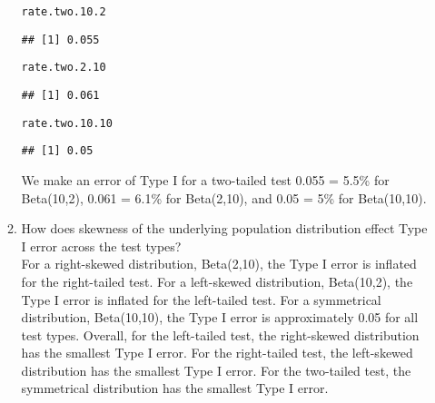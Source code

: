 \documentclass{article}\usepackage[]{graphicx}\usepackage[]{xcolor}
\makeatletter
\newcommand{\hldef}[1]{\textcolor[rgb]{0.345,0.345,0.345}{#1}}%
\newenvironment{kframe}{%
 \def\at@end@of@kframe{}%
 \ifinner\ifhmode%
  \def\at@end@of@kframe{\end{minipage}}%
  \begin{minipage}{\columnwidth}%
 \fi\fi%
 \def\FrameCommand##1{\hskip\@totalleftmargin \hskip-\fboxsep
 \colorbox{shadecolor}{##1}\hskip-\fboxsep
     \hskip-\linewidth \hskip-\@totalleftmargin \hskip\columnwidth}%
 \MakeFramed {\advance\hsize-\width
   \@totalleftmargin\z@ \linewidth\hsize
   \@setminipage}}%
 {\par\unskip\endMakeFramed%
 \at@end@of@kframe}
\newenvironment{knitrout}{}{} %
\makeatother
\begin{document}
\begin{enumerate}
\begin{enumerate}
\begin{knitrout}
\begin{kframe}
\begin{alltt}
\hldef{rate.two.10.2}
\end{alltt}
\begin{verbatim}
## [1] 0.055
\end{verbatim}
\begin{alltt}
\hldef{rate.two.2.10}
\end{alltt}
\begin{verbatim}
## [1] 0.061
\end{verbatim}
\begin{alltt}
\hldef{rate.two.10.10}
\end{alltt}
\begin{verbatim}
## [1] 0.05
\end{verbatim}
\end{kframe}
\end{knitrout}
We make an error of Type I for a two-tailed test 0.055 = 5.5\% for Beta(10,2),  0.061 = 6.1\% for Beta(2,10), and 0.05 = 5\% for Beta(10,10).
    \item How does skewness of the underlying population distribution effect
    Type I error across the test types? \\
    For a right-skewed distribution, Beta(2,10), the Type I error is inflated for the right-tailed test. For a left-skewed distribution, Beta(10,2), the Type I error is inflated for the left-tailed test. For a symmetrical distribution, Beta(10,10), the Type I error is approximately 0.05 for all test types.
    Overall, for the left-tailed test, the right-skewed distribution has the smallest Type I error. For the right-tailed test, the left-skewed distribution has the smallest Type I error. For the two-tailed test, the symmetrical distribution has the smallest Type I error.  
  \end{enumerate}
\end{enumerate}

\end{document}
